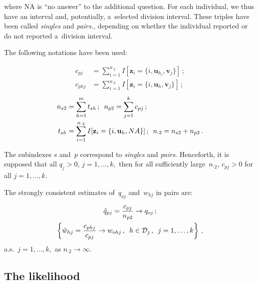 \begin{multicols}{2}
\vspace*{-2pt}

\noindent
where NA is  ``no answer'' to the additional question. For each individual, we thus have an interval and, potentially,
a~selected division interval. These triples have been called
 \textit{singles} and 
\textit{pairs.}, depending on whether the individual reported or do not reported 
a~division interval.

The following notations have been used:

\noindent
\begin{align*}
c_{pj} &=\sum\limits_{i=1}^{n_{\cdot 2}} I [ \mathbf{z}_{i} = \{ i, \mathbf{u}_{h_i},
 \mathbf{v}_j\}]\,;\\ 
c_{phj}&=  \sum\limits_{i=1}^{n_{\cdot 2}} I [ \mathbf{z}_{i} =\{ i,
 \mathbf{u}_{h},  \mathbf{v}_{j} \}]\,;
 \end{align*}
  \begin{align*}
n_{s2} &=\sum\limits_{h=1}^m t_{sh}\,;\enskip n_{p 2} =\sum_{j=1}^k c_{p  j}\,;\\
  t_{sh}&= \sum\limits_{i=1}^{n_{\cdot 2}} I [\mathbf{z}_i =\{ i, \mathbf{u}_{h}, NA\}]\,;
\enskip
n_{\cdot 2}  =n_{s2}+  n_{p2}\,.
\end{align*}

\noindent
  The subindexes $s$ and~$p$ correspond to \textit{singles} and
  \textit{pairs}.
  Henceforth, it is supposed that all $q_j>0$, $j=1, \ldots, k,$ then for all sufficiently 
  large~$n_{\cdot 2}$,
  $c_{pj}>0$ for all $j=1, \ldots, k$.

  The strongly consistent estimates of~$q_{o j}$ and~$w_{hj}$  in pairs
are:
\begin{gather*}
 \check q_{pj}=\displaystyle\frac{\displaystyle c_{pj}\mathstrut}{\displaystyle n_{p2}\mathstrut}\to q_{o j}\,;\\
 \left\{ \hat{w}_{hj}=\displaystyle\frac{\displaystyle c_{phj}\mathstrut}{\displaystyle c_{pj}\mathstrut} \to w_{o hj}\,,  \enskip
 h\in\mathcal{D}_j\,,\enskip    j=1, \ldots, k\right\} \,,
\end{gather*}
  a.s.\ $j=1, \ldots , k,$  as $ n_{\cdot 2}\to\infty$.

\subsection{The likelihood}


\end{multicols}
